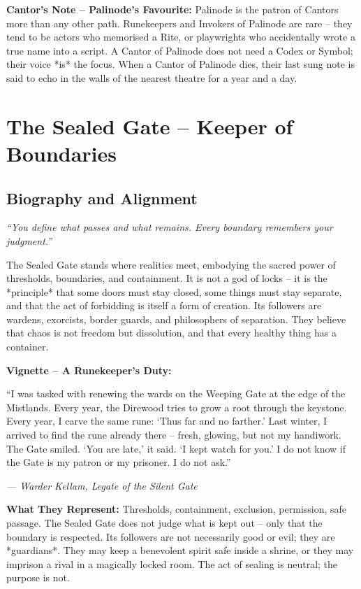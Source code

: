 \documentclass[10pt,a5paper]{book}
\begin{document}
\noindent \textbf{Cantor’s Note – Palinode’s Favourite:}
Palinode is the patron of Cantors more than any other path. Runekeepers and Invokers of Palinode are rare – they tend to be actors who memorised a Rite, or playwrights who accidentally wrote a true name into a script. A Cantor of Palinode does not need a Codex or Symbol; their voice *is* the focus. When a Cantor of Palinode dies, their last sung note is said to echo in the walls of the nearest theatre for a year and a day.

\clearpage

\section{The Sealed Gate – Keeper of Boundaries}
\label{patron:sealedgate}

\subsection*{Biography and Alignment}

\textit{“You define what passes and what remains. Every boundary remembers your judgment.”}

The Sealed Gate stands where realities meet, embodying the sacred power of thresholds, boundaries, and containment. It is not a god of locks – it is the *principle* that some doors must stay closed, some things must stay separate, and that the act of forbidding is itself a form of creation. Its followers are wardens, exorcists, border guards, and philosophers of separation. They believe that chaos is not freedom but dissolution, and that every healthy thing has a container.

\textbf{Vignette – A Runekeeper’s Duty:}
\epigraph{“I was tasked with renewing the wards on the Weeping Gate at the edge of the Mistlands. Every year, the Direwood tries to grow a root through the keystone. Every year, I carve the same rune: ‘Thus far and no farther.’ Last winter, I arrived to find the rune already there – fresh, glowing, but not my handiwork. The Gate smiled. ‘You are late,’ it said. ‘I kept watch for you.’ I do not know if the Gate is my patron or my prisoner. I do not ask.”}{\textit{— Warder Kellam, Legate of the Silent Gate}}

\textbf{What They Represent:} Thresholds, containment, exclusion, permission, safe passage. The Sealed Gate does not judge what is kept out – only that the boundary is respected. Its followers are not necessarily good or evil; they are *guardians*. They may keep a benevolent spirit safe inside a shrine, or they may imprison a rival in a magically locked room. The act of sealing is neutral; the purpose is not.
\end{document}

